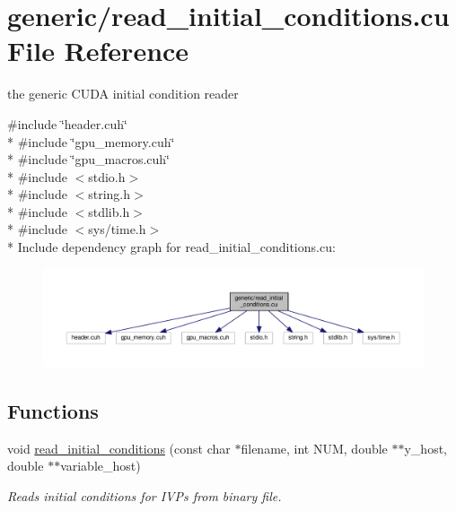 \hypertarget{read__initial__conditions_8cu}{}\section{generic/read\+\_\+initial\+\_\+conditions.cu File Reference}
\label{read__initial__conditions_8cu}


the generic C\+U\+DA initial condition reader  


{\ttfamily \#include \char`\"{}header.\+cuh\char`\"{}}\\*
{\ttfamily \#include \char`\"{}gpu\+\_\+memory.\+cuh\char`\"{}}\\*
{\ttfamily \#include \char`\"{}gpu\+\_\+macros.\+cuh\char`\"{}}\\*
{\ttfamily \#include $<$stdio.\+h$>$}\\*
{\ttfamily \#include $<$string.\+h$>$}\\*
{\ttfamily \#include $<$stdlib.\+h$>$}\\*
{\ttfamily \#include $<$sys/time.\+h$>$}\\*
Include dependency graph for read\+\_\+initial\+\_\+conditions.\+cu\+:\nopagebreak
\begin{figure}[H]
\begin{center}
\leavevmode
\includegraphics[width=350pt]{read__initial__conditions_8cu__incl}
\end{center}
\end{figure}
\subsection*{Functions}
\begin{DoxyCompactItemize}
\item 
void \hyperlink{read__initial__conditions_8cu_a79be377a219a9ab2ae5c3a313b33afed}{read\+\_\+initial\+\_\+conditions} (const char $\ast$filename, int N\+UM, double $\ast$$\ast$y\+\_\+host, double $\ast$$\ast$variable\+\_\+host)
\begin{DoxyCompactList}\small\item\em Reads initial conditions for I\+V\+Ps from binary file. \end{DoxyCompactList}\end{DoxyCompactItemize}


